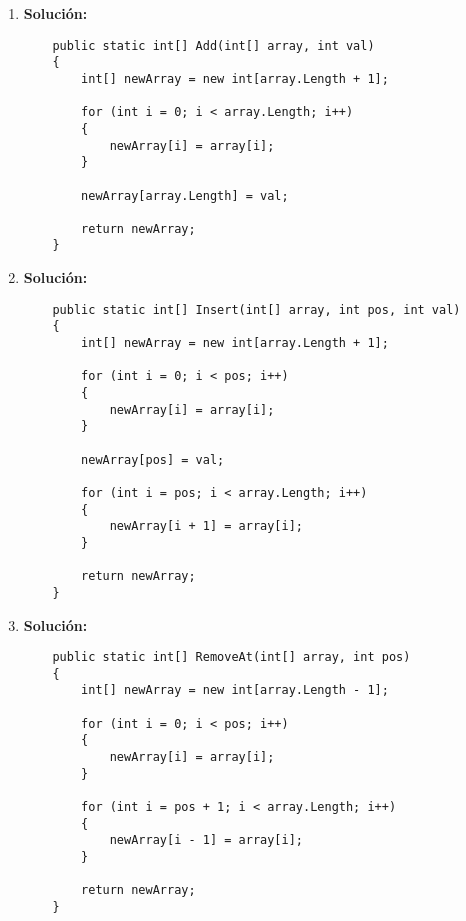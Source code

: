 \begin{enumerate}[label=\alph*)]
    \item \textbf{Solución:}
    \begin{lstlisting}
    public static int[] Add(int[] array, int val)
    {
        int[] newArray = new int[array.Length + 1];
        
        for (int i = 0; i < array.Length; i++)
        {
            newArray[i] = array[i];
        }
        
        newArray[array.Length] = val;
        
        return newArray;
    }
    \end{lstlisting}
    \item \textbf{Solución:}
    \begin{lstlisting}
    public static int[] Insert(int[] array, int pos, int val)
    {
        int[] newArray = new int[array.Length + 1];
        
        for (int i = 0; i < pos; i++)
        {
            newArray[i] = array[i];
        }
        
        newArray[pos] = val;
        
        for (int i = pos; i < array.Length; i++)
        {
            newArray[i + 1] = array[i];
        }
        
        return newArray;
    }
    \end{lstlisting}
    \item \textbf{Solución:}
    \begin{lstlisting}
    public static int[] RemoveAt(int[] array, int pos)
    {
        int[] newArray = new int[array.Length - 1];
        
        for (int i = 0; i < pos; i++)
        {
            newArray[i] = array[i];
        }
        
        for (int i = pos + 1; i < array.Length; i++)
        {
            newArray[i - 1] = array[i];
        }
        
        return newArray;
    }
    \end{lstlisting}
\end{enumerate}
